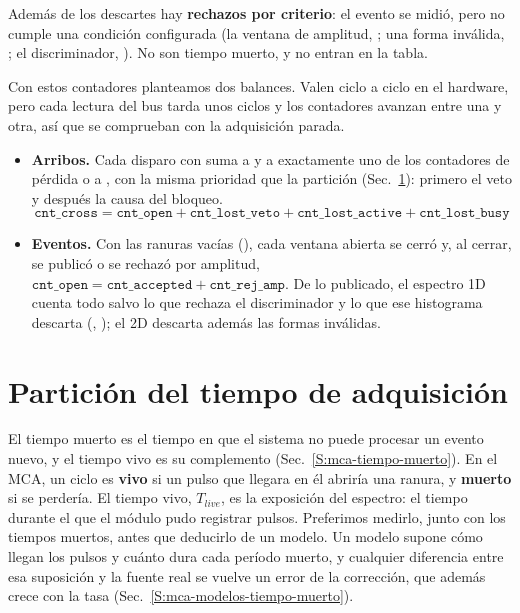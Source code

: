 Además de los descartes hay \textbf{rechazos por criterio}: el evento se midió,
pero no cumple una condición configurada (la ventana de amplitud,
; una forma inválida, ; el
discriminador, ). No son tiempo muerto, y no entran en
la tabla.

Con estos contadores planteamos dos balances. Valen ciclo a ciclo en el
hardware, pero cada lectura del bus tarda unos ciclos y los contadores avanzan
entre una y otra, así que se comprueban con la adquisición parada.
\begin{itemize}
  \item \textbf{Arribos.} Cada disparo con  suma a
     y a exactamente uno de los contadores de pérdida o a
    , con la misma prioridad que la partición
    (Sec.~\ref{S:implmca-particion}): primero el veto y después la causa del
    bloqueo.
    \begin{equation}
      \mathtt{cnt\_cross} = \mathtt{cnt\_open} + \mathtt{cnt\_lost\_veto} +
      \mathtt{cnt\_lost\_active} + \mathtt{cnt\_lost\_busy}
      \label{e:implmca-balance-arribos}
    \end{equation}
  \item \textbf{Eventos.} Con las ranuras vacías (), cada
    ventana abierta se cerró y, al cerrar, se publicó o se rechazó por
    amplitud, $\mathtt{cnt\_open} = \mathtt{cnt\_accepted} +
    \mathtt{cnt\_rej\_amp}$. De lo publicado, el espectro 1D cuenta todo salvo
    lo que rechaza el discriminador y lo que ese histograma descarta
    (, ); el 2D descarta además las
    formas inválidas.
\end{itemize}

\section{Partición del tiempo de adquisición}
\label{S:implmca-particion}

El tiempo muerto es el tiempo en que el sistema no puede procesar un evento
nuevo, y el tiempo vivo es su complemento (Sec.~\ref{S:mca-tiempo-muerto}). En
el MCA, un ciclo es \textbf{vivo} si un pulso que llegara en él abriría una
ranura, y \textbf{muerto} si se perdería. El tiempo vivo, $T_{live}$, es la
exposición del espectro: el tiempo durante el que el módulo pudo registrar
pulsos. Preferimos medirlo, junto con los tiempos muertos, antes que deducirlo
de un modelo. Un modelo supone cómo llegan los pulsos y cuánto dura cada período
muerto, y cualquier diferencia entre esa suposición y la fuente real se vuelve
un error de la corrección, que además crece con la tasa
(Sec.~\ref{S:mca-modelos-tiempo-muerto}).

